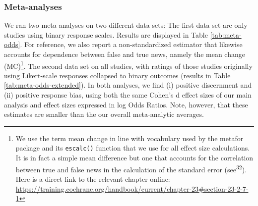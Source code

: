 \documentclass[
  man]{apa6}
\begin{document}
\subsubsection{Meta-analyses}\label{meta-analyses}

We ran two meta-analyses on two different data sets: The first data set are only studies using binary response scales. Results are displayed in Table \ref{tab:meta-odds}. For reference, we also report a non-standardized estimator that likewise accounts for dependence between false and true news, namely the mean change (MC)\footnote{We use the term mean change in line with vocabulary used by the metafor package and its \texttt{escalc()} function that we use for all effect size calculations. It is in fact a simple mean difference but one that accounts for the correlation between true and false news in the calculation of the standard error (see\textsuperscript{32}). Here is a direct link to the relevant chapter online: \url{https://training.cochrane.org/handbook/current/chapter-23\#section-23-2-7-1}}. The second data set on all studies, with ratings of those studies originally using Likert-scale responses collapsed to binary outcomes (results in Table \ref{tab:meta-odds-extended}). In both analyses, we find (i) positive discernment and (ii) positive response bias, using both the same Cohen's d effect sizes of our main analysis and effect sizes expressed in log Odds Ratios. Note, however, that these estimates are smaller than the our overall meta-analytic averages.
\end{document}

